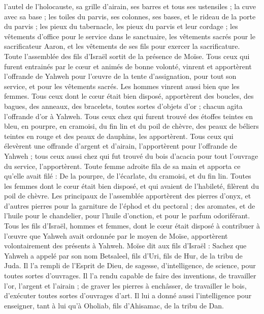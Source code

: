 \begin{multicols}{2}
l'autel de l'holocauste, sa grille d'airain, ses barres et tous ses ustensiles ; la cuve avec sa base ;
les toiles du parvis, ses colonnes, ses bases, et le rideau de la porte du parvis ;
les pieux du tabernacle, les pieux du parvis et leur cordage ;
les vêtements d’office pour le service dans le sanctuaire, les vêtements sacrés pour le sacrificateur Aaron, et les vêtements de ses fils pour exercer la sacrificature.
Toute l'assemblée des fils d'Israël sortit de la présence de Moïse.
Tous ceux qui furent entrainés par le cœur et animés de bonne volonté, vinrent et apportèrent l'offrande de Yahweh pour l’œuvre de la tente d'assignation, pour tout son service, et pour les vêtements sacrés.
Les hommes vinrent aussi bien que les femmes. Tous ceux dont le cœur était bien disposé, apportèrent des boucles, des bagues, des anneaux, des bracelets, toutes sortes d’objets d'or ; chacun agita l’offrande d'or à Yahweh.
Tous ceux chez qui furent trouvé des étoffes teintes en bleu, en pourpre, en cramoisi, du fin lin et du poil de chèvre, des peaux de béliers teintes en rouge et des peaux de dauphins, les apportèrent.
Tous ceux qui élevèrent une offrande d'argent et d'airain, l’apportèrent pour l'offrande de Yahweh ; tous ceux aussi chez qui fut trouvé du bois d’acacia pour tout l'ouvrage du service, l'apportèrent.
Toute femme adroite fila de sa main et apporta ce qu'elle avait filé : De la pourpre, de l'écarlate, du cramoisi, et du fin lin\FTNT{}.
Toutes les femmes dont le cœur était bien disposé, et qui avaient de l’habileté, filèrent du poil de chèvre.
Les principaux de l'assemblée apportèrent des pierres d'onyx, et d’autres pierres pour la garniture de l'éphod et du pectoral ;
des aromates, et de l'huile pour le chandelier, pour l'huile d'onction, et pour le parfum odoriférant.
Tous les fils d’Israël, hommes et femmes, dont le cœur était disposé à contribuer à l’œuvre que Yahweh avait ordonnée par le moyen de Moïse, apportèrent volontairement des présents à Yahweh.
Moïse dit aux fils d'Israël : Sachez que Yahweh a appelé par son nom Betsaleel, fils d'Uri, fils de Hur, de la tribu de Juda.
Il l'a rempli de l'Esprit de Dieu, de sagesse, d’intelligence, de science, pour toutes sortes d'ouvrages.
Il l’a rendu capable de faire des inventions, de travailler l’or, l’argent et l’airain ;
de graver les pierres à enchâsser, de travailler le bois, d’exécuter toutes sortes d’ouvrages d’art.
Il lui a donné aussi l’intelligence pour enseigner, tant à lui qu'à Oholiab, fils d'Ahisamac, de la tribu de Dan.

\end{multicols}
